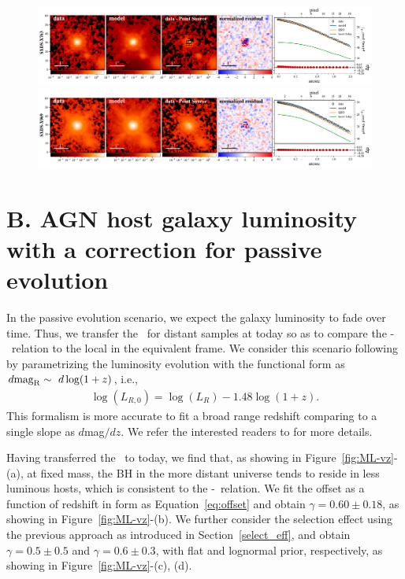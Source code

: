 \documentclass[apj]{emulateapj}
\begin{document}
\begin{figure}
\centering
{
\includegraphics[height=0.25\textwidth]{fig/best_fit_SXDS-X763_SB_profile.pdf}
\includegraphics[height=0.25\textwidth]{fig/best_fit_SXDS-X969_SB_profile.pdf}
}
\end{figure} 

\clearpage
\section{B. AGN host galaxy luminosity with a correction for passive evolution}\label{sec:ml-ev}
In the passive evolution scenario, we expect the galaxy luminosity to fade over time. Thus, we transfer the \lhost\ for distant samples at today so as to compare the \mbh-\lhost\ relation to the local in the equivalent frame.
We consider this scenario following \citet{Ding2017b} by parametrizing the luminosity evolution with the functional form as
$d{\rm mag}_{\rm R}\sim~d\log(1+z)$, i.e.,
\begin{eqnarray}
\label{eq:L_relation}
\log(L_{R,0})=\log(L_{R}) - 1.48 \log (1+z).
\end{eqnarray} 
This formalism is more accurate to fit a broad range redshift comparing to a single slope as $d$mag$/dz$. We refer the interested readers to \citet[][section 5.4]{Ding2017b} for more details.

Having transferred the \lhost\ to today, we find that, as showing in Figure~\ref{fig:ML-vz}-(a), at fixed mass, the BH in the more distant universe tends to reside in less luminous hosts, which is consistent to the \mbh-\smass\ relation. We fit the offset as a function of redshift in form as Equation~\ref{eq:offset} and obtain $\gamma = 0.60 \pm 0.18$, as showing in Figure~\ref{fig:ML-vz}-(b). We further consider the selection effect using the previous approach as introduced in Section~\ref{select_eff}, and obtain $\gamma = 0.5\pm0.5$ and $\gamma = 0.6\pm0.3$, with flat and lognormal prior, respectively, as showing in Figure~\ref{fig:ML-vz}-(c), (d).
\end{document}
